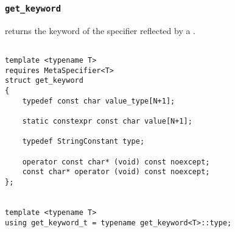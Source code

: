 
\subsubsection{\texttt{get\_keyword}}

returns the keyword of the specifier reflected by a .

\begin{verbatim}

template <typename T>
requires MetaSpecifier<T>
struct get_keyword
{
	typedef const char value_type[N+1];

	static constexpr const char value[N+1];

	typedef StringConstant type;

	operator const char* (void) const noexcept;
	const char* operator (void) const noexcept;
};


template <typename T>
using get_keyword_t = typename get_keyword<T>::type;

\end{verbatim}
